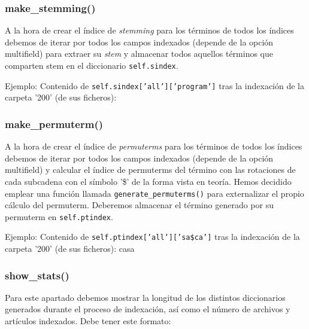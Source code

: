 \documentclass[12pt,a4paper]{article}
\begin{document}
\subsubsection{make\_stemming()}
A la hora de crear el índice de \textit{stemming} para los términos de todos los índices debemos de iterar por todos los campos indexados (depende de la opción multifield) para extraer su \textit{stem} y almacenar todos aquellos términos que comparten stem en el diccionario \texttt{self.sindex}.

Ejemplo: Contenido de \texttt{self.sindex['all']['program']} tras la indexación de la carpeta '200' (de sus ficheros):

\subsubsection{make\_permuterm()}
A la hora de crear el índice de \textit{permuterms} para los términos de todos los índices debemos de iterar por todos los campos indexados (depende de la opción multifield) y calcular el índice de permuterms del término con las rotaciones de cada subcadena con el símbolo '\$' de la forma vista en teoría. Hemos decidido emplear una función llamada \texttt{generate\_permuterms()} para externalizar el propio cálculo del permuterm. Deberemos almacenar el término generado por su permuterm en \texttt{self.ptindex}.

Ejemplo: Contenido de \texttt{self.ptindex['all']['sa\$ca']} tras la indexación de la carpeta '200' (de sus ficheros):
\newline
casa

\subsubsection{show\_stats()}
Para este apartado debemos mostrar la longitud de los distintos diccionarios generados durante el proceso de indexación, así como el número de archivos y artículos indexados. Debe tener este formato:
\end{document}
